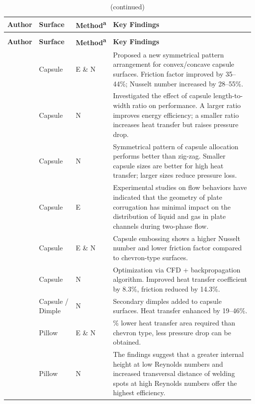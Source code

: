 \documentclass[review,12pt]{elsarticle}
\begin{document}
{\footnotesize
\setlength{\LTleft}{0pt}
\setlength{\LTright}{0pt}
\setlength{\LTpre}{0pt}
\setlength{\LTpost}{0pt}
\begin{longtable}{@{}>{\raggedright}p{2.6cm} >{\raggedright}p{1.6cm} >{\raggedright}p{1.6cm} >{\raggedright\arraybackslash}p{7.2cm}@{}}
\caption{Summary of embossing surface enhancement of PHEs.}
\label{tab:embossing-summary} \\
\hline
\textbf{Author} & \textbf{Surface} & \textbf{Method\textsuperscript{a}} & \textbf{Key Findings} \\
\hline
\endfirsthead
\caption[]{(continued)} \\
\hline
\textbf{Author} & \textbf{Surface} & \textbf{Method\textsuperscript{a}} & \textbf{Key Findings} \\
\hline
\endhead
\hline
\endfoot
\citet{hamedi2024} & Capsule & E \& N & Proposed a new symmetrical pattern arrangement for convex/concave capsule surfaces. Friction factor improved by 35--44\%; Nusselt number increased by 28--55\%. \\
\citet{jiang2019a} & Capsule & N & Investigated the effect of capsule length-to-width ratio on performance. A larger ratio improves energy efficiency; a smaller ratio increases heat transfer but raises pressure drop. \\
\citet{jiang2020} & Capsule & N & Symmetrical pattern of capsule allocation performs better than zig-zag. Smaller capsule sizes are better for high heat transfer; larger sizes reduce pressure loss. \\
\citet{jiang2019} & Capsule & E & Experimental studies on flow behaviors have indicated that the geometry of plate corrugation has minimal impact on the distribution of liquid and gas in plate channels during two-phase flow. \\
\citet{zhang2016} & Capsule & E \& N & Capsule embossing shows a higher Nusselt number and lower friction factor compared to chevron-type surfaces. \\
\citet{yu2024} & Capsule & N & Optimization via CFD + backpropagation algorithm. Improved heat transfer coefficient by 8.3\%, friction reduced by 14.3\%. \\
\citet{shao2024} & Capsule / Dimple & N & Secondary dimples added to capsule surfaces. Heat transfer enhanced by 19--46\%. \\
\citet{arsenyeva2019} & Pillow & E \& N & 30\% lower heat transfer area required than chevron type, less pressure drop can be obtained. \\
\citet{shirzad2019a} & Pillow & N & The findings suggest that a greater internal height at low Reynolds numbers and increased transversal distance of welding spots at high Reynolds numbers offer the highest efficiency. \\

\end{longtable}}
\end{document}
